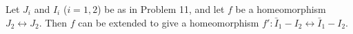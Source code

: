 Let $J_i$ and $I_i$ ($i = 1, 2$) be as in Problem 11, and let $f$ be a homeomorphism $J_2 \leftrightarrow J_2$. Then $f$ can be extended to give a homeomorphism $f': \bar{I}_1 - I_2 \leftrightarrow \bar{I}_1 - I_2$.

